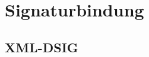 \chapter{Signaturbindung}
%
\label{chp:Signaturbindung}%


\section{XML-DSIG}
%
\label{sec:Signaturbindung:xml-dsig}%
